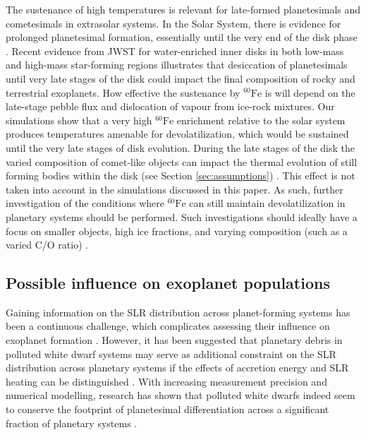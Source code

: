 \documentclass[fleqn,usenatbib]{mnras}
\newcommand{\atom}[2]{$^{#2}\text{#1}$}
\newcommand{\fe}{\atom{Fe}{60}}
\begin{document}
The sustenance of high temperatures is relevant for late-formed planetesimals and cometesimals in extrasolar systems. In the Solar System, there is evidence for prolonged planetesimal formation, essentially until the very end of the disk phase \citep{2020SSRv..216...55K,2022arXiv221204509S,2023ASPC..534..907L}. Recent evidence from JWST for water-enriched inner disks in both low-mass and high-mass star-forming regions \citep{2023Natur.620..516P,2023arXiv231011074R} illustrates that desiccation of planetesimals until very late stages of the disk could impact the final composition of rocky and terrestrial exoplanets. How effective the sustenance by \fe{} is will depend on the late-stage pebble flux and dislocation of vapour from ice-rock mixtures.
Our simulations show that a very high \fe{} enrichment relative to the solar system produces temperatures amenable for devolatilization, which would be sustained until the very late stages of disk evolution.
During the late stages of the disk the varied composition of comet-like objects can impact the thermal evolution of still forming bodies within the disk (see Section \ref{sec:assumptions}) \citep{2021Icar..36314437G,2024arXiv240100231A}.
This effect is not taken into account in the simulations discussed in this paper.
As such, further investigation of the conditions where \fe{} can still maintain devolatilization in planetary systems should be performed.
Such investigations should ideally have a focus on smaller objects, high ice fractions, and varying composition (such as a varied C/O ratio) \citep{2021MNRAS.505.5654D,2021ApJ...913L..20L}.

\subsection{Possible influence on exoplanet populations}

Gaining information on the SLR distribution across planet-forming systems has been a continuous challenge, which complicates assessing their influence on exoplanet formation \citep{2018PrPNP.102....1L,parkerBirthEnvironmentPlanetary2020}. However, it has been suggested that planetary debris in polluted white dwarf systems may serve as additional constraint on the SLR distribution across planetary systems if the effects of accretion energy and SLR heating can be distinguished \citep{2013ApJ...775L..41J,2014AREPS..42...45J}. With increasing measurement precision and numerical modelling, research has shown that polluted white dwarfs indeed seem to conserve the footprint of planetesimal differentiation across a significant fraction of planetary systems \citep{2020MNRAS.492.2683B,2023NatAs...7...39B,2022MNRAS.515..395C}. 
\end{document}
